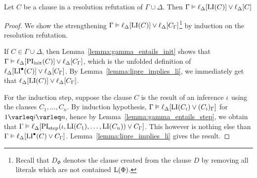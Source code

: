 \begin{comment}
		Let $x_s$ be a $\Delta$-lifting variable which occurs in $\lifdeltanovar{t}$. 
		Then by Lemma~\ref{lemma:lifting_conditions}, $x_s$ is not bound in $\LIpre(C)$.
	We show that $y_t$ is quantified in the scope of the quantification of $x_s$ by discussing the different possibilities for quantification of~$x_s$:

	\begin{itemize}
		\item
			Suppose that $s$ is lifted in $\LI(C)$ as well.
			Then by the definition of the quantifier prefix, the quantification of $x_s$ precedes the quantification for $x_t$ as $s$ is a subterm of $t$.

		\item
			Suppose that in some successor $C'$ of $C$, a successor $s'$ of $s$ is lifted.
			By Lemma~\ref{lemma:successor_li}, any quantifier of  $\LI(C)$, in particular $\exists y_t$, occurs in $\LI(C')$.
			As $s'$ is lifted in $\LI(C')$, the quantification $\forall x_{s'}$ is present in the quantifier prefix of $\LI(C')$. But then the quantifier for $y_t$ is in the scope of the quantifier of $x_{s'}$.

		\item
			Otherwise there is no successor $C'$ of $C$ such that a successor $s'$ of $s$ is lifted in $\LI(C')$.
			Then it is implicitly universally quantified.
			\qedhere
	\end{itemize}
\end{proof}
\end{comment}

\begin{lemma}
	\label{lemma:gamma_entails_delta_lifted_invariant}
	Let $C$ be a clause in a resolution refutation of $\Gamma \cup \Delta$.
	Then
	$\Gamma \vDash \ell_{\Delta}[ \operatorname{LI}(C) ] \lor \ell_{\Delta}[C] $
\end{lemma}
\begin{proof}
	We show the strengthening
	$\Gamma \vDash \ell_{\Delta}[ \operatorname{LI}(C) ] \lor \ell_{\Delta}[C_\Gamma]$\footnote{Recall that $D_\Phi$ denotes the clause created from the clause $D$ by removing all literals which are not contained $\operatorname{L}(\Phi)$.} by induction on the resolution refutation.

	If $C\in \Gamma\cup\Delta$, then Lemma~\ref{lemma:gamma_entails_init} shows that $\Gamma \vDash \ell_{\Delta}[\operatorname{PI}_{\mathrm{init}}(C)] \lor \ell_{\Delta}[C_\Gamma]$, which is the unfolded definition of $\ell_{\Delta}[\operatorname{LI}^\bullet(C)] \lor \ell_{\Delta}[C_\Gamma]$.
	By Lemma~\ref{lemma:lipre_implies_li}, we immediately get that 
	$\ell_{\Delta}[\operatorname{LI}(C)] \lor \ell_{\Delta}[C_\Gamma]$.

	For the induction step, suppose the clause $C$ is the result of an inference $\iota$ using the clauses $C_1, \dots, C_n$.
	By induction hypothesis, $\Gamma \entails \lifdeltanovar{\LI(C_i) \lor\nolinebreak (C_i)_\Gamma}$ for $1\varleq i\varleq n$, hence
	by Lemma~\ref{lemma:gamma_entails_step}, we obtain that 
	$\Gamma \vDash \ell_{\Delta}[\operatorname{PI}_{\mathrm{step}}(\iota, \operatorname{LI}(C_1), \dots, \operatorname{LI}(C_n)) \lor C_\Gamma]$.
	This however is nothing else than $\Gamma \vDash \ell_{\Delta}[\operatorname{LI}^\bullet(C) \lor C_\Gamma]$.
	Lemma~\ref{lemma:lipre_implies_li} gives the result.
\end{proof}

